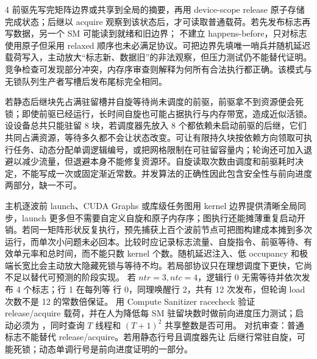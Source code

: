 \begin{solutionexercise}{4}
前驱先写完矩阵边界或共享到全局的摘要，再用 device-scope release 原子存储完成状态；后继以 acquire 观察到该状态后，才可读取普通载荷。若先发布标志再写数据，另一个 SM 可能读到就绪和旧边界； 不建立 happens-before，只对标志使用原子但采用 relaxed 顺序也未必满足协议。可把边界先填唯一哨兵并随机延迟载荷写入，主动放大“标志新、数据旧”的非法观察，但压力测试仍不能替代证明。竞争检查可发现部分冲突，内存序审查则解释为何所有合法执行都正确。该模式与无锁队列生产者写槽后发布尾标完全相同。

若静态后继块先占满驻留槽并自旋等待尚未调度的前驱，前驱拿不到资源便会死锁；即使前驱已经运行，长时间自旋也可能占据执行与内存带宽，造成近似活锁。设设备总共只能驻留 8 块，若调度器先放入 8 个都依赖未启动前驱的后继，它们共同占满资源，等待多久都不会让状态改变。可让有限持久块按依赖方向领取可执行任务、动态分配单调逻辑编号，或把网格限制在可驻留容量内；轮询还可加入退避以减少流量，但退避本身不能修复资源环。自旋读取次数由调度和前驱耗时决定，不能写成一次或固定渐近常数。并发算法的正确性因此包含安全性与前向进度两部分，缺一不可。

主机逐波前 launch、CUDA Graphs 或库级任务图用 kernel 边界提供清晰全局同步，launch 更多但不需要自定义自旋和原子内存序；图执行还能摊薄重复启动开销。若同一矩阵形状反复执行，预先捕获上百个波前节点可把图构建成本摊到多次运行，而单次小问题未必回本。比较时应记录标志流量、自旋指令、前驱等待、有效单元率和总时间，而不能只数 kernel 个数。随机延迟注入、低 occupancy 和极端长宽比会主动放大隐藏死锁与等待不均。若局部协议只在理想调度下更快，它尚不足以替代可预测的阶段实现。
\variantheading 若 $ntr=3,ntc=4$，逻辑行 0 无需等待并依次发布 4 个标志；行 1 在每列等
行 0，同理唤醒行 2，共有 12 次发布，但轮询 load 次数不是 12 的常数倍保证。
\practiceheading 用 Compute Sanitizer racecheck 验证 release/acquire 载荷，并在人为降低每
SM 驻留块数时做前向进度压力测试；启动必须为 ，同时查询 $T$ 线程和
$(T+1)^2$ 共享整数是否可用。
对抗审查：普通  标志不能替代 release/acquire。若用静态行号且调度器先让
后继行常驻自旋，可能死锁；动态单调行号是前向进度证明的一部分。
\end{solutionexercise}

